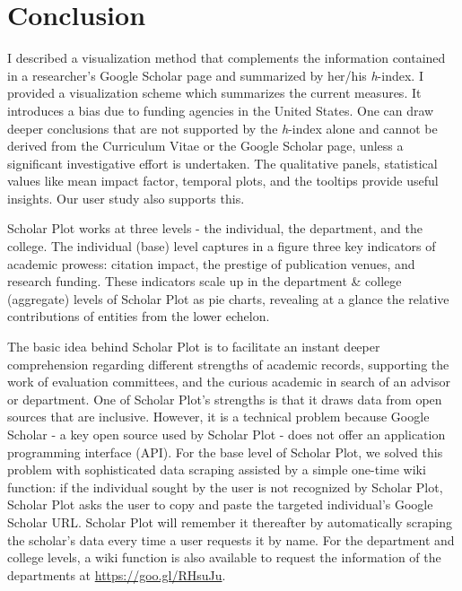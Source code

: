 \chapter{Conclusion}\label{chap:Conclusion}
I described a visualization method that complements the information contained in a researcher's Google Scholar page and summarized by her/his {\it h}-index. I provided a visualization scheme which summarizes the current measures. It introduces a bias due to funding agencies in the United States. One can draw deeper conclusions that are not supported by the {\it h}-index alone and cannot be derived from the Curriculum Vitae or the Google Scholar page, unless a significant investigative effort is undertaken. The qualitative panels, statistical values like mean impact factor, temporal plots, and the tooltips provide useful insights. Our user study also supports this.

Scholar Plot works at three levels - the individual, the department, and the college. The individual (base) level captures in a figure three key indicators of academic prowess: citation impact, the prestige of publication venues, and research funding. These indicators scale up in the department \& college (aggregate) levels of Scholar Plot as pie charts, revealing at a glance the relative contributions of entities from the lower echelon.

The basic idea behind Scholar Plot is to facilitate an instant deeper comprehension regarding different strengths of academic records, supporting the work of evaluation committees, and the curious academic in search of an advisor or department. One of Scholar Plot's strengths is that it draws data from open sources that are inclusive. However, it is a technical problem because Google Scholar - a key open source used by Scholar Plot - does not offer an application programming interface (API). For the base level of Scholar Plot, we solved this problem with sophisticated data scraping assisted by a simple one-time wiki function: if the individual sought by the user is not recognized by Scholar Plot, Scholar Plot asks the user to copy and paste the targeted individual's Google Scholar URL. Scholar Plot will remember it thereafter by automatically scraping the scholar's data every time a user requests it by name. For the department and college levels, a wiki function is also available to request the information of the departments at \url{https://goo.gl/RHsuJu}.

